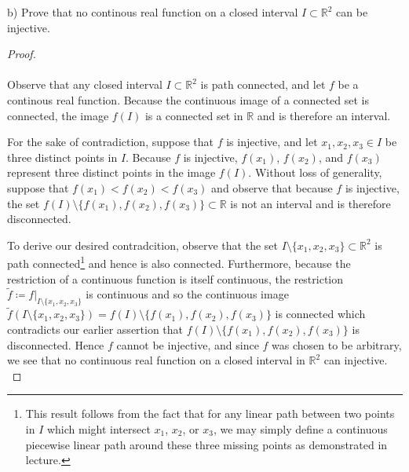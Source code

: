 \pagebreak


b) Prove that no continous real function on a closed interval $I \subset \mathbb{R}^2$ can be injective.

\begin{proof}\ \\\\
    Observe that any closed interval $I \subset \mathbb{R}^2$ is path connected, and let $f$ be a \linebreak
    continous real function. Because the continuous image of a connected set is connected, the image $f(I)$ is a 
    connected set in $\mathbb{R}$ and is therefore an interval.
    
    For the sake of contradiction, suppose that $f$ is injective, and let $x_1, x_2, x_3 \in I$ be three distinct points
    in $I$. Because $f$ is injective, $f(x_1)$, $f(x_2)$, and $f(x_3)$ represent three distinct points in the image 
    $f(I)$. Without loss of generality, suppose that \linebreak
    $f(x_1) < f(x_2) < f(x_3)$ and observe that because $f$ is injective, the set \linebreak
    $f(I) \setminus \{ f(x_1), f(x_2), f(x_3) \} \subset \mathbb{R}$ is not an interval and is therefore disconnected.
    
    To derive our desired contradcition, observe that the set 
    $I \setminus \{x_1, x_2, x_3\} \subset \mathbb{R}^2$ is path connected\footnote{
        This result follows from the fact that for any linear path between two points in $I$ which might intersect 
        $x_1$, $x_2$, or $x_3$, we may simply define a continuous piecewise linear path around these three missing 
        points as demonstrated in lecture.
    } and hence is also connected. Furthermore, because the restriction of a continuous function is itself continuous, 
    the restriction $\tilde{f} \coloneqq f\vert_{I \setminus \{x_1, x_2, x_3\}}$ \linebreak
    is continuous and so the continuous image
    $\tilde{f}(I \setminus \{x_1,x_2,x_3\}) = f(I) \setminus \{f(x_1),f(x_2),f(x_3)\}$
    is connected which contradicts our earlier assertion that $f(I) \setminus \{ f(x_1), f(x_2), f(x_3) \}$ is 
    disconnected. Hence $f$ cannot be injective, and since $f$ was chosen to be arbitrary, we see that no continuous 
    real function on a closed interval in $\mathbb{R}^2$ can injective.
    \ \\
\end{proof}
